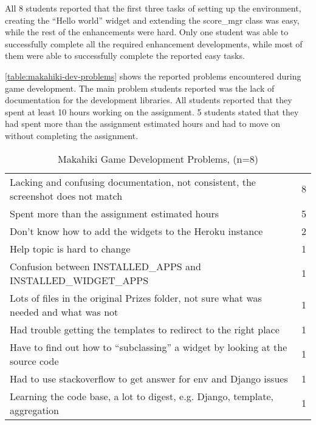 All 8 students reported that the first three tasks of setting up the environment, creating the  ``Hello world'' widget and extending the score\_mgr class was easy, while the rest of the enhancements were hard. Only one student was able to successfully complete all the required enhancement developments, while most of them were able to successfully complete the reported easy tasks. 

\autoref{table:makahiki-dev-problems} shows the reported problems encountered during game development. The main problem students reported was the lack of documentation for the development libraries.  All students reported that they spent at least 10 hours working on the assignment. 5 students stated that they had spent more than the assignment estimated hours and had to move on without completing the assignment. 

\begin{table}[ht!]
  \centering
  \begin{tabular}{|P{0.8\columnwidth}|P{0.14\columnwidth}|}
    \hline
     &
    \\
    \hline
     Lacking and confusing documentation, not consistent, the screenshot does not match & 8 \\
    \hline
    Spent more than the assignment estimated hours & 5 \\
    \hline
    Don't know how to add the widgets to the Heroku instance & 2  \\
    \hline
    Help topic is hard to change & 1 \\
    \hline
    Confusion between INSTALLED\_APPS and INSTALLED\_WIDGET\_APPS & 1\\ 
     \hline
    Lots of files in the original Prizes folder, not sure what was needed and what was not & 1 \\
     \hline
    Had trouble getting the templates to redirect to the right place & 1\\
    \hline
    Have to find out how to ``subclassing'' a widget by looking at the source code & 1 \\
    \hline
    Had to use stackoverflow to get answer for env and Django issues & 1 \\
    \hline
    Learning the code base, a lot to digest, e.g. Django, template, aggregation & 1 \\
    \hline
  \end{tabular}
  \caption{Makahiki Game Development Problems, (n=8)}
  \label{table:makahiki-dev-problems}
\end{table}

